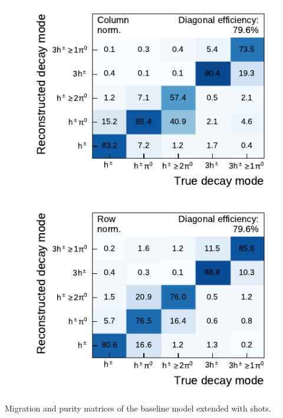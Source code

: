\noindent
\begin{minipage}{\textwidth}
  \captionsetup{type=figure}
  \begin{subfigure}[t]{0.48\textwidth}
    \centering
    \includegraphics{./figures/decay_mode_classification/experiments/mig_mat_shots.pdf}
  \end{subfigure}\hfill
  \begin{subfigure}[t]{0.48\textwidth}
    \centering
    \includegraphics{./figures/decay_mode_classification/experiments/comp_mat_shots.pdf}
  \end{subfigure}
  \caption{Migration and purity matrices of the baseline model extended with
    shots.}
\end{minipage}

\vfill

